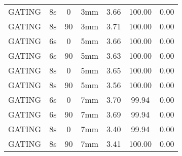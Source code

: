 \begin{table}[H]
\begin{tabular}{|c||c|c|c||c|c|c|}
GATING & 8s & 0 & 3mm & 3.66 & 100.00 & 0.00 \\
GATING & 8s & 90 & 3mm & 3.71 & 100.00 & 0.00 \\
GATING & 6s & 0 & 5mm & 3.66 & 100.00 & 0.00 \\
GATING & 6s & 90 & 5mm & 3.63 & 100.00 & 0.00 \\
GATING & 8s & 0 & 5mm & 3.65 & 100.00 & 0.00 \\
GATING & 8s & 90 & 5mm & 3.56 & 100.00 & 0.00 \\
GATING & 6s & 0 & 7mm & 3.70 & 99.94 & 0.00 \\
GATING & 6s & 90 & 7mm & 3.69 & 99.94 & 0.00 \\
GATING & 8s & 0 & 7mm & 3.40 & 99.94 & 0.00 \\
GATING & 8s & 90 & 7mm & 3.41 & 100.00 & 0.00 \\
    \hline\hline 
  \end{tabular}
\end{table}

\newpage

